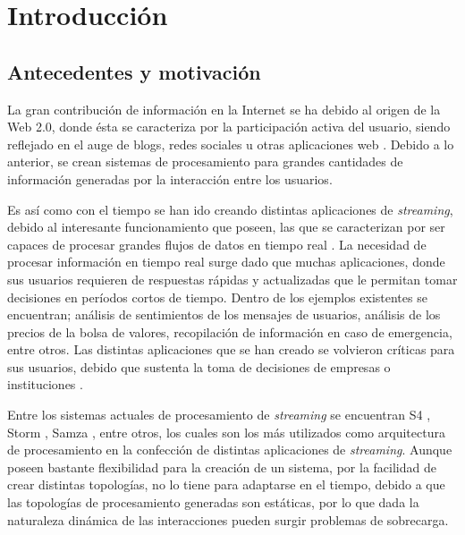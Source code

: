 \chapter{Introducción}
\label{cap:intro}

\section{Antecedentes y motivación}
\label{intro:motivacion}

La gran contribución de información en la Internet se ha debido al origen de la Web 2.0,
donde ésta se caracteriza por la participación activa del usuario, siendo reflejado en el auge de blogs, redes sociales u otras aplicaciones web \cite{web2007oberhelman}. Debido a lo anterior, se crean sistemas de procesamiento para grandes cantidades de información generadas por la interacción entre los usuarios.

Es así como con el tiempo se han ido creando distintas aplicaciones de \textsl{streaming}, debido al interesante funcionamiento que poseen, las que se caracterizan por ser capaces de procesar grandes flujos de datos en tiempo real \cite{ChenZ14a}. La necesidad de procesar informaci\'on en tiempo real surge dado que muchas aplicaciones, donde sus usuarios requieren de respuestas r\'apidas y actualizadas que le permitan tomar decisiones en per\'iodos cortos de tiempo. Dentro de los ejemplos existentes se encuentran; análisis de sentimientos de los mensajes de usuarios, análisis de los precios de la bolsa de valores, recopilación de información en caso de emergencia, entre otros. Las distintas aplicaciones que se han creado se volvieron críticas para sus usuarios, debido que sustenta la toma de decisiones de empresas o instituciones \cite{Wenzel14}.

Entre los sistemas actuales de procesamiento de \textsl{streaming} se encuentran S4 \cite{s4yahoo}, Storm \citep{stormtwitter}, Samza \citep{samza}, entre otros, los cuales son los más utilizados como arquitectura de procesamiento en la confección de distintas aplicaciones de \textsl{streaming}. Aunque poseen bastante flexibilidad para la creación de un sistema, por la facilidad de crear distintas topologías, no lo tiene para adaptarse en el tiempo, debido a que las topolog\'ias de procesamiento generadas son est\'aticas, por lo que dada la naturaleza din\'amica de las interacciones pueden surgir problemas de sobrecarga.


